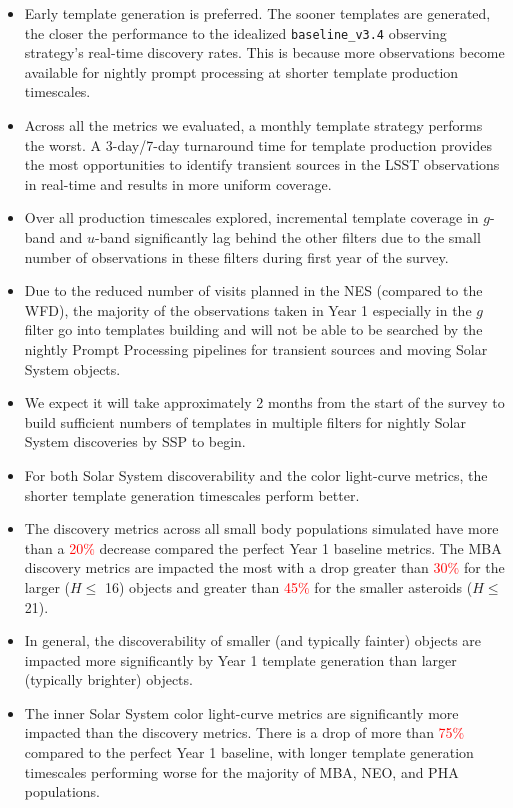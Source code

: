 \documentclass[preprint,linenumbers]{aastex631}
\newcommand{\baseline}{\texttt{baseline\_v3.4}\xspace}
\providecommand{\red}[1]{\textcolor{red}{#1}}
\begin{document}
{		\begin{itemize}
			\item Early template generation is preferred. The sooner templates are generated, the closer the performance to the idealized \baseline observing strategy's real-time discovery rates. This is because more observations become available for nightly prompt processing at shorter template production timescales. 
			\item Across all the metrics we evaluated, a monthly template strategy performs the worst. A 3-day/7-day turnaround time for template production provides the most opportunities to identify transient sources in the LSST observations in real-time and results in more uniform coverage. 
			\item Over all production timescales explored, incremental template coverage in $g$-band and $u$-band significantly lag behind the other filters due to the small number of observations in these filters during first year of the survey. 
			\item Due to the reduced number of visits planned in the NES (compared to the WFD), the majority of the observations taken in Year 1 especially in the $g$ filter go into templates building and will not be able to be searched by the nightly Prompt Processing pipelines for transient sources and moving Solar System objects. 
			\item We expect it will take approximately 2 months from the start of the survey to build sufficient numbers of templates in multiple filters for nightly Solar System discoveries by SSP to begin. 
			\item For both Solar System discoverability and the color light-curve metrics, the shorter template generation timescales perform better. 
			\item The discovery metrics across all small body populations simulated have more than a \red{20$\%$} decrease compared the perfect Year 1 baseline metrics. The MBA discovery metrics are impacted the most with a drop greater than \red{30$\%$} for the larger ($H \leq$ 16) objects and greater than \red{45$\%$} for the smaller asteroids ($H \leq$ 21).  
			\item In general, the discoverability of smaller (and typically fainter) objects are impacted more significantly by Year 1 template generation than larger (typically brighter) objects. 
			\item The inner Solar System color light-curve metrics are significantly more impacted than the discovery  metrics. There is a drop of more than \red{75$\%$} compared to the perfect Year 1 baseline, with longer template generation timescales performing worse for the majority of MBA, NEO, and PHA populations. 
		\end{itemize}
		
}
\end{document}
